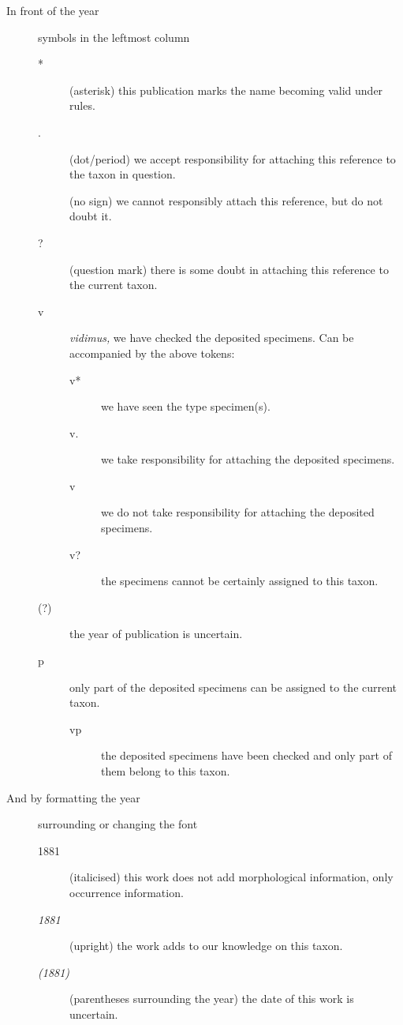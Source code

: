 \begin{description}
    \item[In front of the year] symbols in the leftmost column
    \begin{description}
        \item[*] (asterisk) this publication marks the name becoming valid under
             rules.
        \item[.] (dot/period) we accept responsibility for attaching this reference
            to the taxon in question.
        \item[] (no sign) we cannot responsibly attach this reference, but do not
            doubt it.
        \item[?] (question mark) there is some doubt in attaching this reference to
            the current taxon.
        \item[v] \emph{vidimus,} we have checked the deposited specimens. Can be
            accompanied by the above tokens:
            \begin{description}
                \item[v*] we have seen the type specimen(s).
                \item[v.] we take responsibility for attaching the deposited specimens.
                \item[v] we do not take responsibility for attaching the deposited
                    specimens.
                \item[v?] the specimens cannot be certainly assigned to this taxon.
            \end{description}
        \item[(?)] the year of publication is uncertain.
        \item[p] only part of the deposited specimens can be assigned to the current
            taxon.
            \begin{description}
                \item[vp] the deposited specimens have been checked and only part of
                    them belong to this taxon.
            \end{description}
    \end{description}

\item[And by formatting the year] surrounding or changing the font
    \begin{description}
        \item[1881] (italicised) this work does not add morphological
            information, only occurrence information.
        \item[\emph{1881}] (upright) the work adds to our knowledge on this taxon.
        \item[\emph{(1881)}] (parentheses surrounding the year) the date of this work is
            uncertain.
    \end{description}
\end{description}

